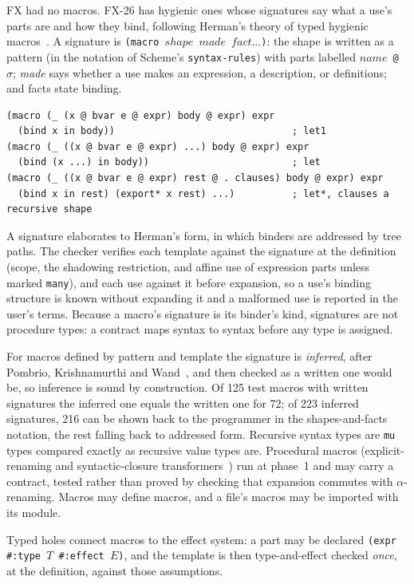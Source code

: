 \documentclass[acmsmall,screen,review]{acmart}
\newcommand{\cd}[1]{\texttt{#1}}
\newcommand{\fx}{FX-26}
\begin{document}
FX had no macros. \fx{} has hygienic ones whose signatures say what a
use's parts are and how they bind, following Herman's theory of typed
hygienic macros~\cite{herman-wand,herman-thesis}. A signature is
\cd{(macro $\mathit{shape}$ $\mathit{made}$ $\mathit{fact}\ldots$)}:
the shape is written as a pattern (in the notation of Scheme's \cd{syntax-rules}) with parts labelled
\cd{$\mathit{name}$ @ $\sigma$}; \emph{made} says whether a use makes an
expression, a description, or definitions; and facts state binding.
\begin{lstlisting}
(macro (_ (x @ bvar e @ expr) body @ expr) expr
  (bind x in body))                               ; let1
(macro (_ ((x @ bvar e @ expr) ...) body @ expr) expr
  (bind (x ...) in body))                         ; let
(macro (_ ((x @ bvar e @ expr) rest @ . clauses) body @ expr) expr
  (bind x in rest) (export* x rest) ...)          ; let*, clauses a recursive shape
\end{lstlisting}
A signature elaborates to Herman's form, in which binders are addressed
by tree paths. The checker verifies each template against the signature
at the definition (scope, the shadowing restriction, and affine use of
expression parts unless marked \cd{many}), and each use against it
before expansion, so a use's binding structure is known without
expanding it and a malformed use is reported in the user's terms.
Because a macro's signature is its binder's kind, signatures are not
procedure types: a contract maps syntax to syntax before any type is
assigned.

For macros defined by pattern and template the signature is \emph{inferred}, after
Pombrio, Krishnamurthi and Wand~\cite{inferring-scope}, and then
checked as a written one would be, so inference is sound by
construction. Of 125 test macros with written signatures the inferred
one equals the written one for 72; of 223 inferred signatures, 216 can
be shown back to the programmer in the shapes-and-facts notation, the
rest falling back to addressed form. Recursive syntax types are
\cd{mu} types compared exactly as recursive value types are.
Procedural macros (explicit-renaming and syntactic-closure
transformers~\cite{clinger-er,hanson}) run at phase~1 and may carry a
contract, tested rather than proved by checking that expansion commutes
with $\alpha$-renaming. Macros may define macros, and a file's macros
may be imported with its module.

Typed holes connect macros to the effect system: a part may be declared
\cd{(expr \#:type $T$ \#:effect $E$)}, and the template is then
type-and-effect checked \emph{once}, at the definition, against those
assumptions.
\end{document}
